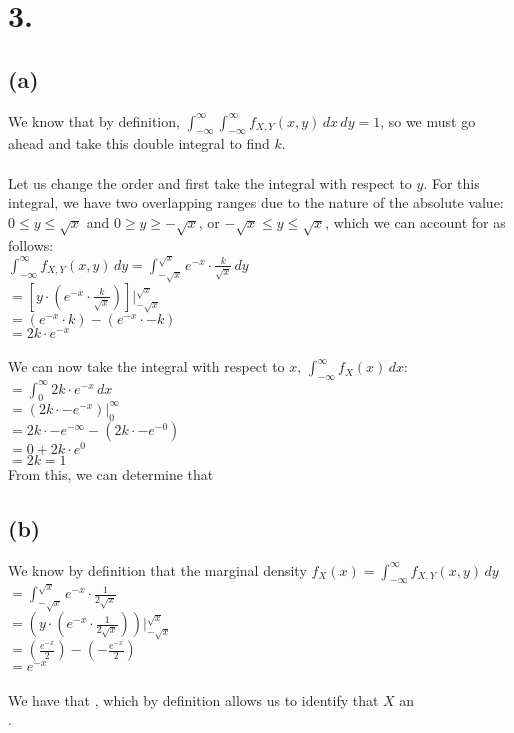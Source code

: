 \documentclass{article}
\begin{document}
\section*{3.}
{\Large 

\subsection*{(a)}
We know that by definition, $\int_{-\infty}^{\infty} \int_{-\infty}^{\infty} f_{X, Y} (x, y) \,dx \,dy = 1$, so we must go ahead and take this double integral to find $k$. \\ \\
Let us change the order and first take the integral with respect to $y$. For this integral, we have two overlapping ranges due to the nature of the absolute value: $0 \leq y \leq \sqrt{x}$ and $0 \geq y \geq -\sqrt{x}$, or $-\sqrt{x} \leq y \leq \sqrt{x}$, which we can account for as follows: \\ 
$\int_{-\infty}^{\infty} f_{X, Y} (x, y) \,dy = \int_{-\sqrt{x}}^{\sqrt{x}} e^{-x} \cdot \frac{k}{\sqrt{x}} \,dy$ \\
$= [y \cdot (e^{-x} \cdot \frac{k}{\sqrt{x}})] |_{-\sqrt{x}}^{\sqrt{x}}$ \\ 
$= (e^{-x} \cdot k) - (e^{-x} \cdot -k)$ \\ 
$= 2k \cdot e^{-x}$ \\ \\
We can now take the integral with respect to $x$,
$\int_{-\infty}^{\infty} f_{X} (x) \,dx$: \\ 
$ = \int_{0}^{\infty} 2k \cdot e^{-x} \,dx$ \\ 
$ = (2k \cdot -e^{-x}) |_{0}^{\infty}$ \\ 
$ = 2k \cdot -e^{-\infty} - (2k \cdot -e^{-0})$ \\ 
$ = 0 + 2k \cdot e^{0}$ \\ 
$ = 2k = 1$ \\
From this, we can determine that 

\subsection*{(b)}
We know by definition that the marginal density $f_X (x) = \int_{-\infty}^{\infty} f_{X, Y} (x, y) \,dy$ \\ 
$= \int_{-\sqrt{x}}^{\sqrt{x}} e^{-x} \cdot \frac{1}{2\sqrt{x}}$ \\ 
$= (y \cdot (e^{-x} \cdot \frac{1}{2\sqrt{x}})) |_{-\sqrt{x}}^{\sqrt{x}}$ \\ 
$= (\frac{e^{-x}}{2}) - (-\frac{e^{-x}}{2})$ \\ 
$= e^{-x}$ \\ \\
We have that , which by definition allows us to identify that $X$ an \\ .

}
\end{document}
